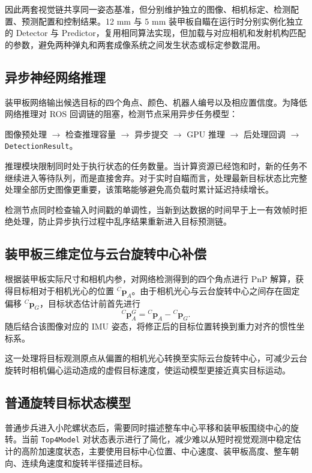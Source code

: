 因此两套视觉链共享同一姿态基准，但分别维护独立的图像、相机标定、检测配置、预测配置和控制结果。12 mm 与 5 mm 装甲板自瞄在运行时分别实例化独立的 Detector 与 Predictor，复用相同算法实现，但加载与对应相机和发射机构匹配的参数，避免两种弹丸和两套成像系统之间发生状态或标定参数混用。

\subsection{异步神经网络推理}
装甲板网络输出候选目标的四个角点、颜色、机器人编号以及相应置信度。为降低网络推理对 ROS 回调链的阻塞，检测节点采用异步任务模型：
\begin{center}
    图像预处理 $\rightarrow$ 检查推理容量 $\rightarrow$ 异步提交
    $\rightarrow$ GPU 推理 $\rightarrow$ 后处理回调
    $\rightarrow$ \lstinline{DetectionResult}。
\end{center}

推理模块限制同时处于执行状态的任务数量。当计算资源已经饱和时，新的任务不继续进入等待队列，而是直接舍弃。对于实时自瞄而言，处理最新目标状态比完整处理全部历史图像更重要，该策略能够避免高负载时累计延迟持续增长。

检测节点同时检查输入时间戳的单调性，当新到达数据的时间早于上一有效帧时拒绝处理，防止异步执行过程中乱序结果重新进入目标预测链。

\subsection{装甲板三维定位与云台旋转中心补偿}
根据装甲板实际尺寸和相机内参，对网络检测得到的四个角点进行 PnP 解算，获得目标相对于相机光心的位置 ${}^{C}\boldsymbol{p}_A$。由于相机光心与云台旋转中心之间存在固定偏移 ${}^{C}\boldsymbol{p}_G$，目标状态估计前首先进行
\begin{equation}
    {}^{C}\boldsymbol{p}_A^{G}
    = {}^{C}\boldsymbol{p}_A - {}^{C}\boldsymbol{p}_G .
\end{equation}
随后结合该图像对应的 IMU 姿态，将修正后的目标位置转换到重力对齐的惯性坐标系。

这一处理将目标观测原点从偏置的相机光心转换至实际云台旋转中心，可减少云台旋转时相机偏心运动造成的虚假目标速度，使运动模型更接近真实目标运动。

\subsection{普通旋转目标状态模型}
普通步兵进入小陀螺状态后，需要同时描述整车中心平移和装甲板围绕中心的旋转。当前 \lstinline{Top4Model} 对状态表示进行了简化，减少难以从短时视觉观测中稳定估计的高阶加速度状态，主要使用目标中心位置、中心速度、装甲板高度、整车朝向、连续角速度和旋转半径描述目标。

